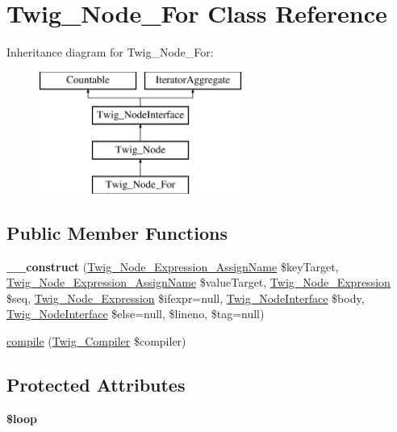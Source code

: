 \hypertarget{class_twig___node___for}{}\section{Twig\+\_\+\+Node\+\_\+\+For Class Reference}
\label{class_twig___node___for}
Inheritance diagram for Twig\+\_\+\+Node\+\_\+\+For\+:\begin{figure}[H]
\begin{center}
\leavevmode
\includegraphics[height=4.000000cm]{class_twig___node___for}
\end{center}
\end{figure}
\subsection*{Public Member Functions}
\begin{DoxyCompactItemize}
\item 
\hypertarget{class_twig___node___for_ad34a0520c567b99c329b7749c00dbea1}{}{\bfseries \+\_\+\+\_\+construct} (\hyperlink{class_twig___node___expression___assign_name}{Twig\+\_\+\+Node\+\_\+\+Expression\+\_\+\+Assign\+Name} \$key\+Target, \hyperlink{class_twig___node___expression___assign_name}{Twig\+\_\+\+Node\+\_\+\+Expression\+\_\+\+Assign\+Name} \$value\+Target, \hyperlink{class_twig___node___expression}{Twig\+\_\+\+Node\+\_\+\+Expression} \$seq, \hyperlink{class_twig___node___expression}{Twig\+\_\+\+Node\+\_\+\+Expression} \$ifexpr=null, \hyperlink{interface_twig___node_interface}{Twig\+\_\+\+Node\+Interface} \$body, \hyperlink{interface_twig___node_interface}{Twig\+\_\+\+Node\+Interface} \$else=null, \$lineno, \$tag=null)\label{class_twig___node___for_ad34a0520c567b99c329b7749c00dbea1}

\item 
\hyperlink{class_twig___node___for_a4e0faa87c3fae583620b84d3607085da}{compile} (\hyperlink{class_twig___compiler}{Twig\+\_\+\+Compiler} \$compiler)
\end{DoxyCompactItemize}
\subsection*{Protected Attributes}
\begin{DoxyCompactItemize}
\item 
\hypertarget{class_twig___node___for_ae7d53f6b57a5cd2cec9cadec7e80910a}{}{\bfseries \$loop}\label{class_twig___node___for_ae7d53f6b57a5cd2cec9cadec7e80910a}

\end{DoxyCompactItemize}


